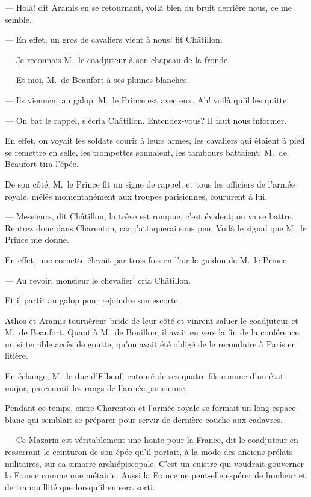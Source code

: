 — Holà! dit Aramis en se retournant, voilà bien du bruit derrière nous, ce me semble.

— En effet, un gros de cavaliers vient à nous! fit Châtillon.

— Je reconnais M.~le coadjuteur à son chapeau de la fronde.

— Et moi, M.~de Beaufort à ses plumes blanches.

— Ils viennent au galop. M.~le Prince est avec eux. Ah! voilà qu'il les quitte.

— On bat le rappel, s'écria Châtillon. Entendez-vous? Il faut nous informer.

En effet, on voyait les soldats courir à leurs armes, les cavaliers qui étaient à pied se remettre en selle, les trompettes sonnaient, les tambours battaient; M.~de Beaufort tira l'épée.

De son côté, M.~le Prince fit un signe de rappel, et tous les officiers de l'armée royale, mêlés momentanément aux troupes parisiennes, coururent à lui.

— Messieurs, dit Châtillon, la trêve est rompue, c'est évident; on va se battre. Rentrez donc dans Charenton, car j'attaquerai sous peu. Voilà le signal que M.~le Prince me donne.

En effet, une cornette élevait par trois fois en l'air le guidon de M.~le Prince.

— Au revoir, monsieur le chevalier! cria Châtillon.

Et il partit au galop pour rejoindre son escorte.

Athos et Aramis tournèrent bride de leur côté et vinrent saluer le coadjuteur et M.~de Beaufort. Quant à M.~de Bouillon, il avait eu vers la fin de la conférence un si terrible accès de goutte, qu'on avait été obligé de le reconduire à Paris en litière.

En échange, M.~le duc d'Elbeuf, entouré de ses quatre fils comme d'un état-major, parcourait les rangs de l'armée parisienne.

Pendant ce temps, entre Charenton et l'armée royale se formait un long espace blanc qui semblait se préparer pour servir de dernière couche aux cadavres.

— Ce Mazarin est véritablement une honte pour la France, dit le coadjuteur en resserrant le ceinturon de son épée qu'il portait, à la mode des anciens prélats militaires, sur sa simarre archiépiscopale. C'est un cuistre qui voudrait gouverner la France comme une métairie. Aussi la France ne peut-elle espérer de bonheur et de tranquillité que lorsqu'il en sera sorti.

